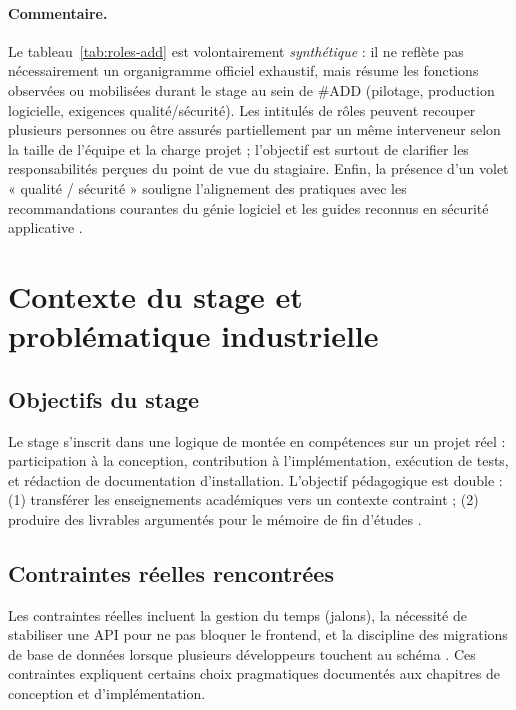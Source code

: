 \paragraph{Commentaire.}
Le tableau~\ref{tab:roles-add} est volontairement \emph{synthétique} : il ne reflète pas nécessairement un organigramme officiel exhaustif, mais résume les fonctions observées ou mobilisées durant le stage au sein de \#ADD (pilotage, production logicielle, exigences qualité/sécurité). Les intitulés de rôles peuvent recouper plusieurs personnes ou être assurés partiellement par un même interveneur selon la taille de l'équipe et la charge projet ; l'objectif est surtout de clarifier les responsabilités perçues du point de vue du stagiaire. Enfin, la présence d'un volet « qualité / sécurité » souligne l'alignement des pratiques avec les recommandations courantes du génie logiciel et les guides reconnus en sécurité applicative \cite{owasp2021,sommerville2016}.

\newpage
\section{Contexte du stage et problématique industrielle}

\subsection{Objectifs du stage}

Le stage s'inscrit dans une logique de montée en compétences sur un projet réel : participation à la conception, contribution à l'implémentation, exécution de tests, et rédaction de documentation d'installation. L'objectif pédagogique est double : (1) transférer les enseignements académiques vers un contexte contraint ; (2) produire des livrables argumentés pour le mémoire de fin d'études \cite{sommerville2016}.

\subsection{Contraintes réelles rencontrées}

Les contraintes réelles incluent la gestion du temps (jalons), la nécessité de stabiliser une API pour ne pas bloquer le frontend, et la discipline des migrations de base de données lorsque plusieurs développeurs touchent au schéma \cite{kleppmann2017,date2003}. Ces contraintes expliquent certains choix pragmatiques documentés aux chapitres de conception et d'implémentation.

